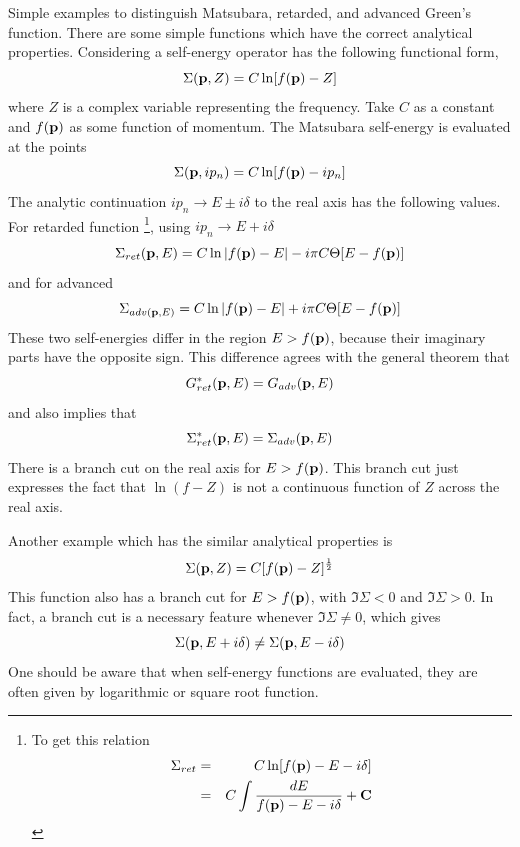 Simple examples to distinguish Matsubara, retarded, and advanced Green's function.
There are some simple functions which have the correct analytical properties.
Considering a self-energy operator has the following functional form,
\begin{equation}
  \Sigma(\mathbf{p},Z) = C \ln [f(\mathbf{p}) -Z] \label{3.143}
\end{equation}
where $Z$ is a complex variable representing the frequency. Take $C$ as a constant and $f(\mathbf{p})$ as some function of momentum.
The Matsubara self-energy is evaluated at the points
\begin{equation}
  \Sigma(\mathbf{p},ip_n) = C \ln [f(\mathbf{p})-ip_n] \label{3.144}
\end{equation}
The analytic continuation $ip_n \to E  \pm i\delta$ to the real axis has the following values.
For retarded function \footnote{
To get this relation
\begin{eqnarray*}
    \Sigma_{ret} &=& C \ln [f(\mathbf{p})-E-i\delta]\\
    &=& C \int \frac{dE}{f(\mathbf{p})-E-i\delta} + \mathbf{C}
\end{eqnarray*}
}, using $ip_n \to E + i \delta$
\begin{equation}
  \Sigma_{ret}(\mathbf{p},E) = C \ln \abs{f(\mathbf{p}) -E} - i\pi C \Theta[E-f(\mathbf{p})] \label{3.145}
\end{equation}
and for advanced
\begin{equation}
  \Sigma_{adv(\mathbf{p},E)} = C \ln \abs{f(\mathbf{p})-E} + i\pi C \Theta[E-f(\mathbf{p})]  \label{3.146}
\end{equation}
These two self-energies differ in the region $E>f(\mathbf{p})$, because their imaginary parts have the opposite sign. This difference agrees with the general theorem that
\begin{equation}
  G^*_{ret}(\mathbf{p},E) = G_{adv}(\mathbf{p},E) \label{3.147}
\end{equation}
and also implies that
\begin{equation}
  \Sigma_{ret}^*(\mathbf{p},E) = \Sigma_{adv}(\mathbf{p},E) \label{3.148}
\end{equation}
There is a branch cut on the real axis for $E>f(\mathbf{p})$. This branch cut just expresses the fact that $\ln(f-Z)$ is not a continuous function of $Z$ across the real axis.

Another example which has the similar analytical properties is
\begin{equation}
  \Sigma(\mathbf{p},Z) = C[f(\mathbf{p}) -Z]^{\frac{1}{2}} \label{3.149}
\end{equation}
This function also has a branch cut for $E>f(\mathbf{p})$, with $\Im\Sigma<0$ and $\Im\Sigma>0$.
In fact, a branch cut is a necessary feature whenever $\Im \Sigma \neq 0$, which gives
\begin{equation}
  \Sigma(\mathbf{p},E+i\delta) \neq \Sigma(\mathbf{p},E-i\delta)  \label{3.150}
\end{equation}
One should be aware that when self-energy functions are evaluated, they are often given by logarithmic or square root function.

